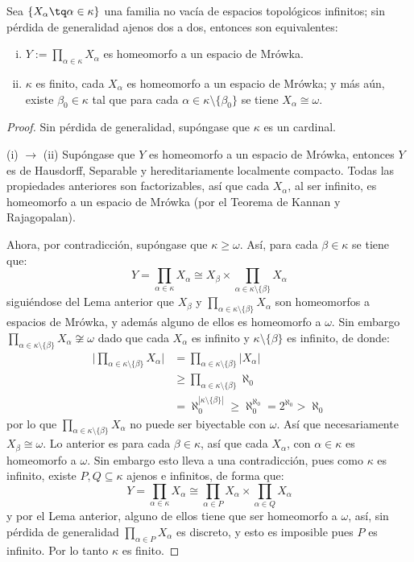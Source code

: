 	\begin{corolario}
		Sea $\{X_\alpha \tq \alpha \in \kappa \}$ una familia no vacía de espacios topológicos infinitos; sin pérdida de generalidad ajenos dos a dos, entonces son equivalentes:
		\begin{enumerate}[i)]
			\item $\displaystyle Y:=\prod_{\alpha \in \kappa} X_\alpha$ es homeomorfo a un espacio de Mrówka.
			\item $\kappa$ es finito, cada $X_\alpha$ es homeomorfo a un espacio de Mrówka; y más aún, existe $\beta_0 \in \kappa$ tal que para cada $\alpha \in \kappa \setminus \{\beta_0\}$ se tiene $X_\alpha \cong \omega$.
		\end{enumerate}
	\end{corolario}
	
	\begin{proof} 
		Sin pérdida de generalidad, supóngase que $\kappa$ es un cardinal.
	
		(i) $\to$ (ii) Supóngase que $Y$ es homeomorfo a un espacio de Mrówka, entonces $Y$ es de Hausdorff, Separable y hereditariamente localmente compacto. Todas las propiedades anteriores son factorizables, así que cada $X_\alpha$, al ser infinito, es homeomorfo a un espacio de Mrówka (por el Teorema de Kannan y Rajagopalan). 
		
		Ahora, por contradicción, supóngase que $\kappa \geq \omega$. Así, para cada $\beta \in \kappa$ se tiene que:
		$$ Y = \prod_{\alpha \in \kappa} X_\alpha \cong X_\beta \times \prod_{\alpha \in \kappa \setminus \{\beta\}} X_\alpha $$
		siguiéndose del Lema anterior que $X_\beta$ y $\prod_{\alpha \in \kappa \setminus \{\beta\}} X_\alpha$ son homeomorfos a espacios de Mrówka, y además alguno de ellos es homeomorfo a $\omega$. Sin embargo $\prod_{\alpha \in \kappa \setminus \{\beta\}} X_\alpha \not\cong \omega$ dado que cada $X_\alpha$ es infinito y $\kappa \setminus \{\beta\}$ es infinito, de donde:
		\begin{align*}
			\Bigg| \prod_{\alpha \in \kappa\setminus \{\beta\}} X_\alpha \Bigg| & = \prod_{\alpha \in \kappa\setminus \{\beta\}} |X_\alpha| \\
			& \geq \prod_{\alpha \in \kappa\setminus \{\beta\}} \aleph_0 \\
			& = \aleph_0^{|\kappa \setminus \{\beta\}|} \geq \aleph_0^{\aleph_0} = 2^{\aleph_0} > \aleph_0
		\end{align*}
		por lo que $\prod_{\alpha \in \kappa \setminus \{\beta\}} X_\alpha$ no puede ser biyectable con $\omega$. Así que necesariamente $X_\beta \cong \omega$. Lo anterior es para cada $\beta \in \kappa$, así que cada $X_\alpha$, con $\alpha \in \kappa$ es homeomorfo a $\omega$. Sin embargo esto lleva a una contradicción, pues como $\kappa$ es infinito, existe $P,Q \subseteq \kappa$ ajenos e infinitos, de forma que:
		$$ Y = \prod_{\alpha \in \kappa} X_\alpha \cong \prod_{\alpha \in P} X_\alpha \times \prod_{\alpha \in Q} X_\alpha $$
		y por el Lema anterior, alguno de ellos tiene que ser homeomorfo a $\omega$, así, sin pérdida de generalidad $\prod_{\alpha \in P} X_\alpha$ es discreto, y esto es imposible pues $P$ es infinito. Por lo tanto $\kappa$ es finito.
		

\end{proof}
